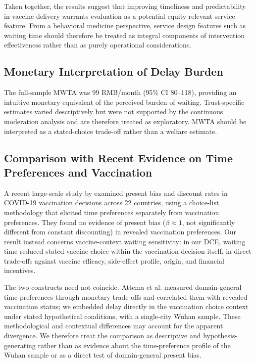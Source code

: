 \documentclass[12pt]{article}
\begin{document}
Taken together, the results suggest that improving timeliness and predictability in vaccine delivery warrants evaluation as a potential equity-relevant service feature. From a behavioral medicine perspective, service design features such as waiting time should therefore be treated as integral components of intervention effectiveness rather than as purely operational considerations.

\subsection{Monetary Interpretation of Delay Burden}

The full-sample MWTA was 99 RMB/month (95\% CI 80--118), providing an intuitive monetary equivalent of the perceived burden of waiting. Trust-specific estimates varied descriptively but were not supported by the continuous moderation analysis and are therefore treated as exploratory. MWTA should be interpreted as a stated-choice trade-off rather than a welfare estimate.

\subsection{Comparison with Recent Evidence on Time Preferences and Vaccination}

A recent large-scale study by \textcite{Attema2025} examined present bias and discount rates in COVID-19 vaccination decisions across 22 countries, using a choice-list methodology that elicited time preferences separately from vaccination preferences. They found no evidence of present bias ($\beta \approx 1$, not significantly different from constant discounting) in revealed vaccination preferences. Our result instead concerns vaccine-context waiting sensitivity: in our DCE, waiting time reduced stated vaccine choice within the vaccination decision itself, in direct trade-offs against vaccine efficacy, side-effect profile, origin, and financial incentives.

The two constructs need not coincide. Attema et al. measured domain-general time preferences through monetary trade-offs and correlated them with revealed vaccination status; we embedded delay directly in the vaccination choice context under stated hypothetical conditions, with a single-city Wuhan sample. These methodological and contextual differences may account for the apparent divergence. We therefore treat the comparison as descriptive and hypothesis-generating rather than as evidence about the time-preference profile of the Wuhan sample or as a direct test of domain-general present bias.
\end{document}
